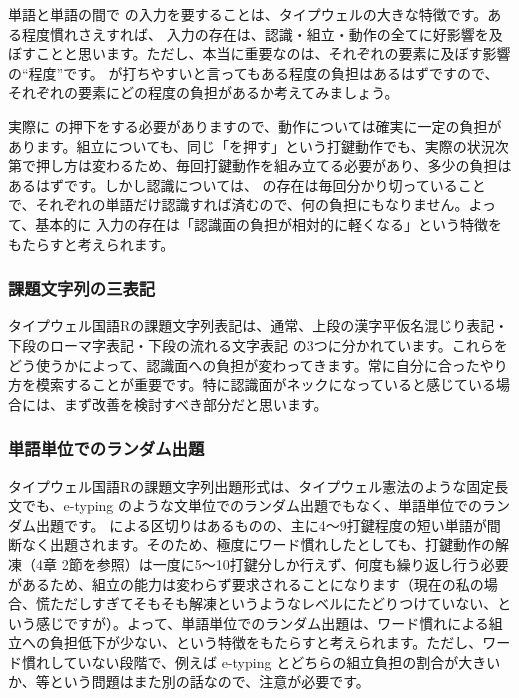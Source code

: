 単語と単語の間で  の入力を要することは、タイプウェルの大きな特徴です。ある程度慣れさえすれば、 入力の存在は、認識・組立・動作の全てに好影響を及ぼすことと思います。ただし、本当に重要なのは、それぞれの要素に及ぼす影響の“程度”です。 が打ちやすいと言ってもある程度の負担はあるはずですので、それぞれの要素にどの程度の負担があるか考えてみましょう。

実際に  の押下をする必要がありますので、動作については確実に一定の負担があります。組立についても、同じ「を押す」という打鍵動作でも、実際の状況次第で押し方は変わるため、毎回打鍵動作を組み立てる必要があり、多少の負担はあるはずです。しかし認識については、 の存在は毎回分かり切っていることで、それぞれの単語だけ認識すれば済むので、何の負担にもなりません。よって、基本的に  入力の存在は「認識面の負担が相対的に軽くなる」という特徴をもたらすと考えられます。

\subsubsection*{課題文字列の三表記}

タイプウェル国語Rの課題文字列表記は、通常、上段の漢字平仮名混じり表記・下段のローマ字表記・下段の流れる文字表記 の3つに分かれています。これらをどう使うかによって、認識面への負担が変わってきます。常に自分に合ったやり方を模索することが重要です。特に認識面がネックになっていると感じている場合には、まず改善を検討すべき部分だと思います。

\subsubsection*{単語単位でのランダム出題}

タイプウェル国語Rの課題文字列出題形式は、タイプウェル憲法のような固定長文でも、e-typing のような文単位でのランダム出題でもなく、単語単位でのランダム出題です。 による区切りはあるものの、主に4～9打鍵程度の短い単語が間断なく出題されます。そのため、極度にワード慣れしたとしても、打鍵動作の解凍（4章 2節を参照）は一度に5～10打鍵分しか行えず、何度も繰り返し行う必要があるため、組立の能力は変わらず要求されることになります（現在の私の場合、慌ただしすぎてそもそも解凍というようなレベルにたどりつけていない、という感じですが）。よって、単語単位でのランダム出題は、ワード慣れによる組立への負担低下が少ない、という特徴をもたらすと考えられます。ただし、ワード慣れしていない段階で、例えば e-typing とどちらの組立負担の割合が大きいか、等という問題はまた別の話なので、注意が必要です。


